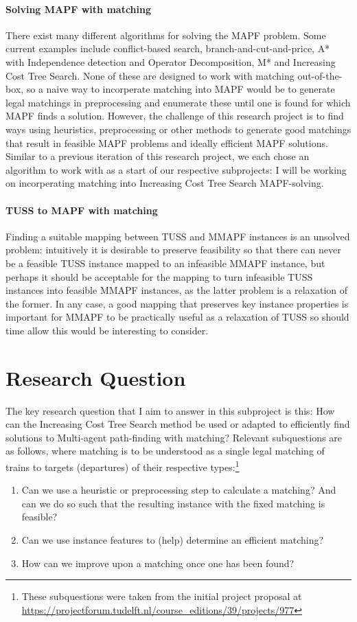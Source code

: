 \documentclass[a4paper,10pt,english]{article}
\begin{document}
\paragraph{Solving MAPF with matching}
There exist many different algorithms for solving the MAPF problem. 
Some current examples include conflict-based search\cite{sharon2015}, branch-and-cut-and-price\cite{lam2019}, A* with Independence detection and Operator Decomposition\cite{standley2010}, M*\cite{wagner2011} and Increasing Cost Tree Search\cite{sharon2011}. 
None of these are designed to work with matching out-of-the-box, so a naive way to incorperate matching into MAPF would be to generate legal matchings in preprocessing and enumerate these until one is found for which MAPF finds a solution. 
However, the challenge of this research project is to find ways using heuristics, preprocessing or other methods to generate good matchings that result in feasible MAPF problems and ideally efficient MAPF solutions. 
Similar to a previous iteration of this research project, we each chose an algorithm to work with as a start of our respective subprojects: I will be working on incorperating matching into Increasing Cost Tree Search MAPF-solving. 

\paragraph{TUSS to MAPF with matching}
Finding a suitable mapping between TUSS and MMAPF instances is an unsolved problem: intuitively it is desirable to preserve feasibility so that there can never be a feasible TUSS instance mapped to an infeasible MMAPF instance, but perhaps it should be acceptable for the mapping to turn infeasible TUSS instances into feasible MMAPF instances, as the latter problem is a relaxation of the former. In any case, a good mapping that preserves key instance properties is important for MMAPF to be practically useful as a relaxation of TUSS so should time allow this would be interesting to consider.


\section*{Research Question}
The key research question that I aim to answer in this subproject is this: How can the Increasing Cost Tree Search method be used or adapted to efficiently find solutions to Multi-agent path-finding with matching? Relevant subquestions are as follows, where matching is to be understood as a single legal matching of trains to targets (departures) of their respective types:\footnote{These subquestions were taken from the initial project proposal at \url{https://projectforum.tudelft.nl/course_editions/39/projects/977}}
\begin{enumerate}
	\item Can we use a heuristic or preprocessing step to calculate a matching? And can we do so such that the resulting instance with the fixed matching is feasible?
	\item Can we use instance features to (help) determine an efficient matching?
	\item How can we improve upon a matching once one has been found?
\end{enumerate}
\end{document}
